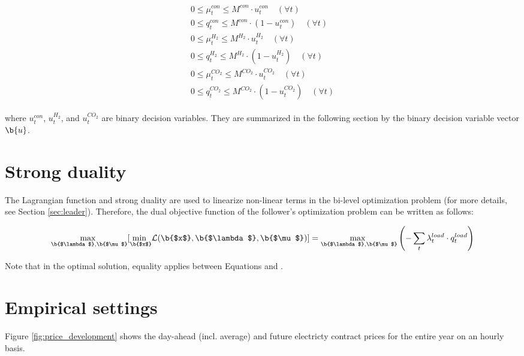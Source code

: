 \documentclass[review]{elsarticle}
\begin{document}
\begin{align}\label{cc}
	\begin{aligned}
		0 \leq \mu_{t}^{con} \leq M^{con} \cdot u_{t}^{con} \quad (\forall t)\\
		0 \leq q_{t}^{con} \leq M^{con} \cdot (1-u_{t}^{con}) \quad (\forall t)\\
		0 \leq \mu_{t}^{H_2} \leq M^{H_2} \cdot u_{t}^{H_2}\quad (\forall t)\\
		0 \leq q_{t}^{H_2} \leq M^{H_2} \cdot (1-u_{t}^{H_2})\quad (\forall t)\\
		0 \leq \mu_{t}^{CO_2} \leq M^{CO_2} \cdot u_{t}^{CO_2}\quad (\forall t)\\
		0 \leq q_{t}^{CO_2} \leq M^{CO_2} \cdot (1-u_{t}^{CO_2})\quad (\forall t)
	\end{aligned}
\end{align}

where $u_{t}^{con}$, $u_{t}^{H_2}$, and $u_{t}^{CO_2}$ are binary decision variables. They are summarized in the following section by the binary decision variable vector $\b{u}$.

\section{Strong duality}\label{AppendixB}
The Lagrangian function and strong duality are used to linearize non-linear terms in the bi-level optimization problem (for more details, see Section \ref{sec:leader}). Therefore, the dual objective function of the follower's optimization problem can be written as follows:

\begin{align}\label{duality}
	\underset{\b{$\lambda$}, \b{$\mu$}}{\mathrm{max~}} [\underset{\b{$x$}}{\mathrm{min~}} \mathcal{L}(\b{$x$}, \b{$\lambda$}, \b{$\mu$})] =\underset{\b{$\lambda$}, \b{$\mu$}}{\mathrm{max~}} \left(- \sum_{t} \lambda_{t}^{load}\cdot q_{t}^{load}\right)
\end{align}

Note that in the optimal solution, equality applies between Equations  and .

\section{Empirical settings}\label{app:a}

Figure \ref{fig:price_development} shows the day-ahead (incl. average) and future electricty contract prices for the entire year on an hourly basis.
\end{document}
